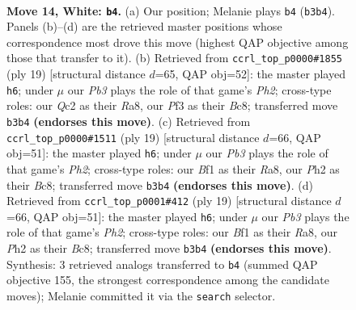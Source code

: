 \documentclass[11pt]{article}
\begin{document}
\clearpage

\begin{figure}[p]\centering
\begin{subfigure}{0.46\textwidth}\centering
\resizebox{\linewidth}{!}{%
\newchessgame
\chessboard[
  setfen={rnbqr1k1/pp3ppp/2p4n/3p4/P2P1B1b/1PN1PP2/2QKN1PP/R4B1R w - - 3 14},
  showmover=false,
  pgfstyle=straightmove, color=movearrow, markmove={b3-b4}
]}
\caption{}
\end{subfigure}\hfill
\begin{subfigure}{0.46\textwidth}\centering
\resizebox{\linewidth}{!}{%
\newchessgame
\chessboard[
  setfen={r1b1k2r/1pqnbppp/p2p1n2/P3p3/4P3/1NN1B2P/1PP2PP1/R2QKB1R b KQkq - 0 10},
  showmover=false,
  pgfstyle=straightmove, color=movearrow, markmove={h7-h6}
]}
\caption{}
\end{subfigure}
\\[4pt]
\begin{subfigure}{0.46\textwidth}\centering
\resizebox{\linewidth}{!}{%
\newchessgame
\chessboard[
  setfen={r1b1k2r/1pqnbppp/p2p1n2/4p3/P3P1P1/1NN1B2P/1PP2P2/R2QKB1R b KQkq - 0 10},
  showmover=false,
  pgfstyle=straightmove, color=movearrow, markmove={h7-h6}
]}
\caption{}
\end{subfigure}\hfill
\begin{subfigure}{0.46\textwidth}\centering
\resizebox{\linewidth}{!}{%
\newchessgame
\chessboard[
  setfen={r1b1k2r/1pqnbppp/p2p1n2/4p3/P3P1P1/1NN1B2P/1PP2P2/R2QKB1R b KQkq - 0 10},
  showmover=false,
  pgfstyle=straightmove, color=movearrow, markmove={h7-h6}
]}
\caption{}
\end{subfigure}
\caption{\textbf{Move 14, White: \texttt{b4}.} (a) Our position; Melanie plays \texttt{b4} (\texttt{b3b4}). Panels (b)--(d) are the retrieved master positions whose correspondence most drove this move (highest QAP objective among those that transfer to it). (b) Retrieved from \texttt{ccrl\_top\_p0000\#1855} (ply 19) [structural distance $d$=65, QAP obj=52]: the master played \texttt{h6}; under $\mu$ our \emph{Pb3} plays the role of that game's \emph{Ph2}; cross-type roles: our \emph{Q}c2 as their \emph{R}a8, our \emph{P}f3 as their \emph{B}c8; transferred move \texttt{b3b4} \textbf{(endorses this move)}. (c) Retrieved from \texttt{ccrl\_top\_p0000\#1511} (ply 19) [structural distance $d$=66, QAP obj=51]: the master played \texttt{h6}; under $\mu$ our \emph{Pb3} plays the role of that game's \emph{Ph2}; cross-type roles: our \emph{B}f1 as their \emph{R}a8, our \emph{P}h2 as their \emph{B}c8; transferred move \texttt{b3b4} \textbf{(endorses this move)}. (d) Retrieved from \texttt{ccrl\_top\_p0001\#412} (ply 19) [structural distance $d$=66, QAP obj=51]: the master played \texttt{h6}; under $\mu$ our \emph{Pb3} plays the role of that game's \emph{Ph2}; cross-type roles: our \emph{B}f1 as their \emph{R}a8, our \emph{P}h2 as their \emph{B}c8; transferred move \texttt{b3b4} \textbf{(endorses this move)}. Synthesis: 3 retrieved analogs transferred to \texttt{b4} (summed QAP objective 155, the strongest correspondence among the candidate moves); Melanie committed it via the \texttt{search} selector.}
\label{fig:thought-m26}
\end{figure}
\end{document}
